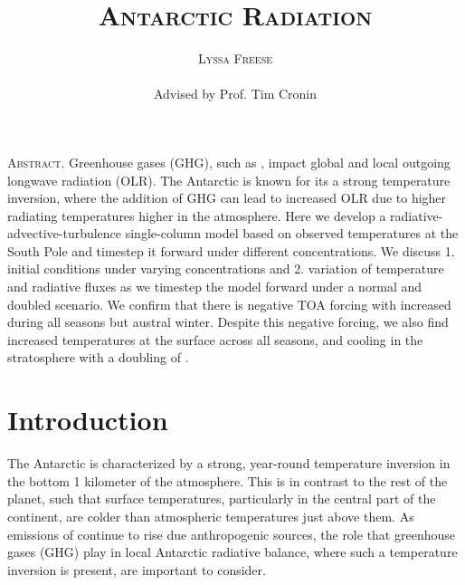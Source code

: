 \documentclass[12]{article}
\title{{\textsc{\Large Antarctic Radiation}}}
\author{\textsc{Lyssa Freese}
\\\\
Advised by Prof. Tim Cronin}
\begin{document}
\maketitle
\thispagestyle{empty}

\setlength{\leftskip}{1.1cm}
\setlength{\rightskip}{1.1cm}


\bigskip
\bigskip

{\textsc{Abstract.} }
Greenhouse gases (GHG), such as , impact global and local outgoing longwave radiation (OLR). The Antarctic is known for its a strong temperature inversion, where the addition of GHG can lead to increased OLR due to higher radiating temperatures higher in the atmosphere. Here we develop a radiative-advective-turbulence single-column model based on observed temperatures at the South Pole and timestep it forward under different  concentrations. We discuss 1. initial conditions under varying  concentrations and 2. variation of temperature and radiative fluxes as we timestep the model forward under a normal and doubled  scenario. We confirm that there is negative TOA forcing with increased  during all seasons but austral winter. Despite this negative forcing, we also find increased temperatures at the surface across all seasons, and cooling in the stratosphere with a doubling of .
\bigskip
\bigskip 
\clearpage
\setcounter{page}{1}

\setlength{\leftskip}{0cm}
\setlength{\rightskip}{0cm}

\section{Introduction}
The Antarctic is characterized by a strong, year-round temperature inversion in the bottom 1 kilometer of the atmosphere. This is in contrast to the rest of the planet, such that surface temperatures, particularly in the central part of the continent, are colder than atmospheric temperatures just above them\citep{hudson_look_2005}. As emissions of  continue to rise due anthropogenic sources, the role that greenhouse gases (GHG) play in local Antarctic radiative balance, where such a temperature inversion is present, are important to consider.
\end{document}

